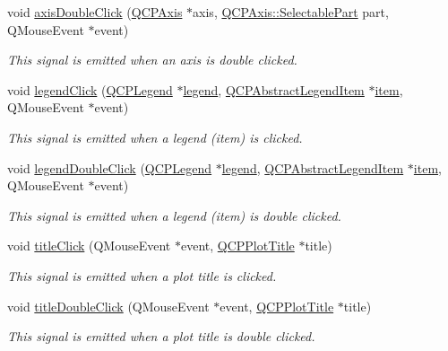 \begin{DoxyCompactItemize}
void \hyperlink{classQCustomPlot_a6df35357460181a72da3e93d600f5256}{axis\+Double\+Click} (\hyperlink{classQCPAxis}{Q\+C\+P\+Axis} $\ast$axis, \hyperlink{classQCPAxis_abee4c7a54c468b1385dfce2c898b115f}{Q\+C\+P\+Axis\+::\+Selectable\+Part} part, Q\+Mouse\+Event $\ast$event)
\begin{DoxyCompactList}\small\item\em This signal is emitted when an axis is double clicked. \end{DoxyCompactList}\item 
void \hyperlink{classQCustomPlot_a79cff0baafbca10a3aaf694d2d3b9ab3}{legend\+Click} (\hyperlink{classQCPLegend}{Q\+C\+P\+Legend} $\ast$\hyperlink{classQCustomPlot_a4eadcd237dc6a09938b68b16877fa6af}{legend}, \hyperlink{classQCPAbstractLegendItem}{Q\+C\+P\+Abstract\+Legend\+Item} $\ast$\hyperlink{classQCustomPlot_a3e842b5a65b1d17fbb96cfb1fa1314d1}{item}, Q\+Mouse\+Event $\ast$event)
\begin{DoxyCompactList}\small\item\em This signal is emitted when a legend (item) is clicked. \end{DoxyCompactList}\item 
void \hyperlink{classQCustomPlot_a0250f835c044521df1619b132288bca7}{legend\+Double\+Click} (\hyperlink{classQCPLegend}{Q\+C\+P\+Legend} $\ast$\hyperlink{classQCustomPlot_a4eadcd237dc6a09938b68b16877fa6af}{legend}, \hyperlink{classQCPAbstractLegendItem}{Q\+C\+P\+Abstract\+Legend\+Item} $\ast$\hyperlink{classQCustomPlot_a3e842b5a65b1d17fbb96cfb1fa1314d1}{item}, Q\+Mouse\+Event $\ast$event)
\begin{DoxyCompactList}\small\item\em This signal is emitted when a legend (item) is double clicked. \end{DoxyCompactList}\item 
void \hyperlink{classQCustomPlot_a2137a819e518fee7edd1c0bf5984d8d6}{title\+Click} (Q\+Mouse\+Event $\ast$event, \hyperlink{classQCPPlotTitle}{Q\+C\+P\+Plot\+Title} $\ast$title)
\begin{DoxyCompactList}\small\item\em This signal is emitted when a plot title is clicked. \end{DoxyCompactList}\item 
void \hyperlink{classQCustomPlot_ad51d65f6abf5edfaeef6e0519a4c1a2f}{title\+Double\+Click} (Q\+Mouse\+Event $\ast$event, \hyperlink{classQCPPlotTitle}{Q\+C\+P\+Plot\+Title} $\ast$title)
\begin{DoxyCompactList}\small\item\em This signal is emitted when a plot title is double clicked. \end{DoxyCompactList}\item 

\end{DoxyCompactItemize}
